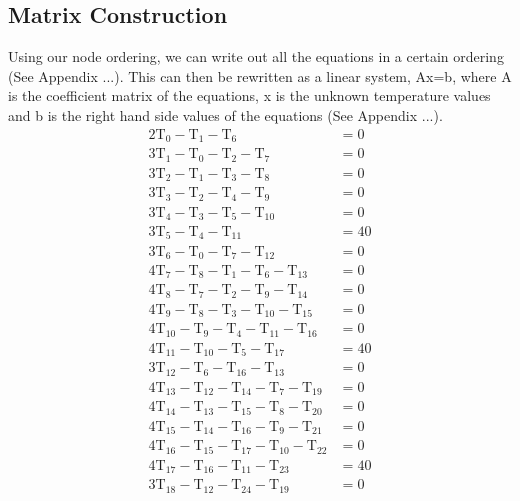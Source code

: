 \documentclass[12pt,a4paper]{article}
\begin{document}
\subsection{Matrix Construction}
Using our node ordering, we can write out all the equations in a certain ordering (See Appendix ...). This can then be rewritten as a linear system, Ax=b, where A is the coefficient matrix of the equations, x is the unknown temperature values and b is the right hand side values of the equations (See Appendix ...). 
\begin{align*}
  2\text{T}_0-\text{T}_1-\text{T}_6              & =0\\
  3\text{T}_1-\text{T}_0-\text{T}_2-\text{T}_7          & =0\\
  3\text{T}_2-\text{T}_1-\text{T}_3-\text{T}_8          & =0\\
  3\text{T}_3-\text{T}_2-\text{T}_4-\text{T}_9          & =0\\
  3\text{T}_4-\text{T}_3-\text{T}_5-\text{T}_{10}       & =0\\
  3\text{T}_5-\text{T}_4-\text{T}_{11}           & =40\\
  3\text{T}_6-\text{T}_0-\text{T}_7-\text{T}_{12}       & =0\\
  4\text{T}_7-\text{T}_8-\text{T}_1-\text{T}_6-\text{T}_{13}   & =0\\
  4\text{T}_8-\text{T}_7-\text{T}_2-\text{T}_9-\text{T}_{14}   & =0\\
  4\text{T}_9-\text{T}_8-\text{T}_3-\text{T}_{10}-\text{T}_{15}& =0\\
  4\text{T}_{10}-\text{T}_9-\text{T}_4-\text{T}_{11}-\text{T}_{16} & =0\\
  4\text{T}_{11}-\text{T}_{10}-\text{T}_5-\text{T}_{17} & =40\\
  3\text{T}_{12}-\text{T}_6-\text{T}_{16}-\text{T}_{13} & =0\\
  4\text{T}_{13}-\text{T}_{12}-\text{T}_{14}-\text{T}_{7}-\text{T}_{19} & =0\\
  4\text{T}_{14}-\text{T}_{13}-\text{T}_{15}-\text{T}_{8}-\text{T}_{20} & =0\\
  4\text{T}_{15}-\text{T}_{14}-\text{T}_{16}-\text{T}_{9}-\text{T}_{21} & =0\\
  4\text{T}_{16}-\text{T}_{15}-\text{T}_{17}-\text{T}_{10}-\text{T}_{22}& =0\\
  4\text{T}_{17}-\text{T}_{16}-\text{T}_{11}-\text{T}_{23} & =40\\
  3\text{T}_{18}-\text{T}_{12}-\text{T}_{24}-\text{T}_{19} & =0\\

\end{align*}
\end{document}

